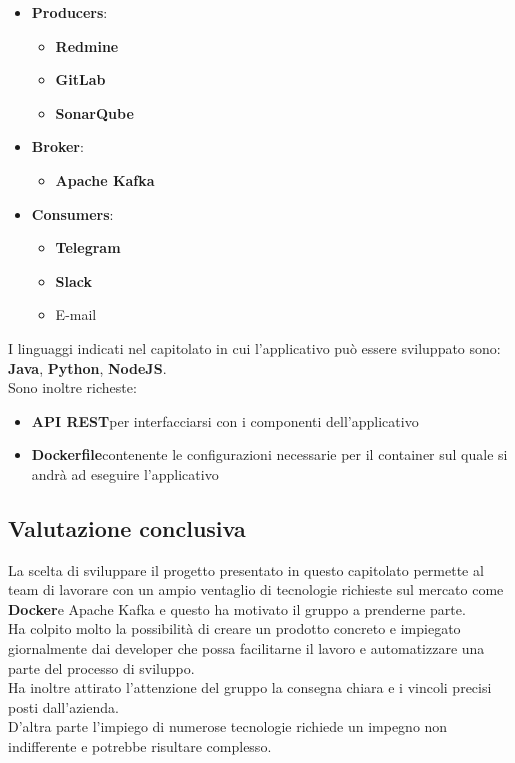 	\begin{itemize}
		\item \textbf{Producers}\GAlt:
		\begin{itemize}
			\item \textbf{Redmine}\GAlt
			\item \textbf{GitLab}\GAlt
			\item \textbf{SonarQube}\GAlt
		\end{itemize}
		\item \textbf{Broker}\GAlt:
		\begin{itemize}
			\item \textbf{Apache Kafka}\GAlt
		\end{itemize}
		\item \textbf{Consumers}\GAlt:
		\begin{itemize}
			\item \textbf{Telegram}\GAlt
			\item \textbf{Slack}\GAlt
			\item E-mail
		\end{itemize}
	\end{itemize}
	I linguaggi indicati nel capitolato in cui l'applicativo può essere sviluppato sono: \textbf{Java}\GAlt, \textbf{Python}\GAlt, \textbf{NodeJS}\GAlt.\\
	Sono inoltre richeste:
	\begin{itemize}
		\item \textbf{API REST}\GAlt per interfacciarsi con i componenti dell'applicativo
		\item \textbf{Dockerfile}\GAlt contenente le configurazioni necessarie per il container sul quale si andrà ad eseguire l'applicativo
	\end{itemize}

    \subsection{Valutazione conclusiva}
	La scelta di sviluppare il progetto presentato in questo capitolato permette al team di lavorare con un ampio ventaglio di tecnologie richieste sul mercato come \textbf{Docker}\GAlt e Apache Kafka e questo ha motivato il gruppo a prenderne parte.\\
	Ha colpito molto la possibilità di creare un prodotto concreto e impiegato giornalmente dai developer che possa facilitarne il lavoro e automatizzare una parte del processo di sviluppo.\\
	Ha inoltre attirato l'attenzione del gruppo la consegna chiara e i vincoli precisi posti dall'azienda.\\
	D'altra parte l'impiego di numerose tecnologie richiede un impegno non indifferente e potrebbe risultare complesso.
	